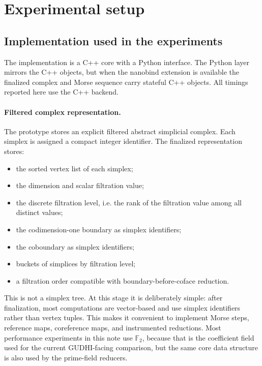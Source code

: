 \documentclass[11pt]{article}
\newcommand{\Ftwo}{\mathbb{F}_2}
\begin{document}
\tableofcontents

\section{Experimental setup}

\subsection{Implementation used in the experiments}

The implementation is a C++ core with a Python interface.  The Python layer mirrors the C++
objects, but when the nanobind extension is available the finalized complex and Morse
sequence carry stateful C++ objects.  All timings reported here use the C++ backend.

\paragraph{Filtered complex representation.}
The prototype stores an explicit filtered abstract simplicial complex.  Each simplex is
assigned a compact integer identifier.  The finalized representation stores:
\begin{itemize}
  \item the sorted vertex list of each simplex;
  \item the dimension and scalar filtration value;
  \item the discrete filtration level, i.e. the rank of the filtration value among all
        distinct values;
  \item the codimension-one boundary as simplex identifiers;
  \item the coboundary as simplex identifiers;
  \item buckets of simplices by filtration level;
  \item a filtration order compatible with boundary-before-coface reduction.
\end{itemize}
This is not a simplex tree.  At this stage it is deliberately simple: after finalization,
most computations are vector-based and use simplex identifiers rather than vertex tuples.
This makes it convenient to implement Morse steps, reference maps, coreference maps, and
instrumented reductions.  Most performance experiments in this note use $\Ftwo$, because
that is the coefficient field used for the current GUDHI-facing comparison, but the same
core data structure is also used by the prime-field reducers.
\end{document}
